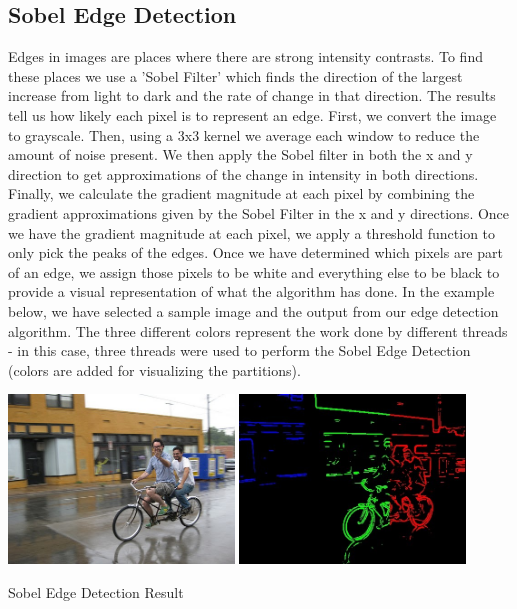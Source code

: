 \documentclass{article}
\begin{document}
    \subsection{Sobel Edge Detection}
        Edges in images are places where there are strong intensity contrasts. To find these places we use a 'Sobel Filter' which finds the direction of the largest increase from light to dark and the rate of change in that direction. The results tell us how likely each pixel is to represent an edge. 
        First, we convert the image to grayscale. Then, using a 3x3 kernel we average each window to reduce the amount of noise present. We then apply the Sobel filter in both the x and y direction to get approximations of the change in intensity in both directions. Finally, we calculate the gradient magnitude at each pixel by combining the gradient approximations given by the Sobel Filter in the x and y directions. Once we have the gradient magnitude at each pixel, we apply a threshold function to only pick the peaks of the edges. Once we have determined which pixels are part of an edge, we assign those pixels to be white and everything else to be black to provide a visual representation of what the algorithm has done. In the example below, we have selected a sample image and the output from our edge detection algorithm. The three different colors represent the work done by different threads - in this case, three threads were used to perform the Sobel Edge Detection (colors are added for visualizing the partitions).
        \begin{center}
        \includegraphics[width=0.45\textwidth]{source/images/edge_detection_before.jpg}
        \includegraphics[width=0.45\textwidth]{source/images/edge_detection_complete.jpg}
        
        \caption{Sobel Edge Detection Result}
        \end{center}
        
\end{document}
